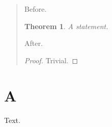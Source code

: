 \documentclass{article}
\newtheorem{theorem}{Theorem}
\begin{document}
\begin{quote}
Before.
\begin{theorem} A statement. \end{theorem}
After.
\begin{proof} Trivial. \end{proof}
\tableofcontents
\end{quote}
\section{A}
Text.
\end{document}
